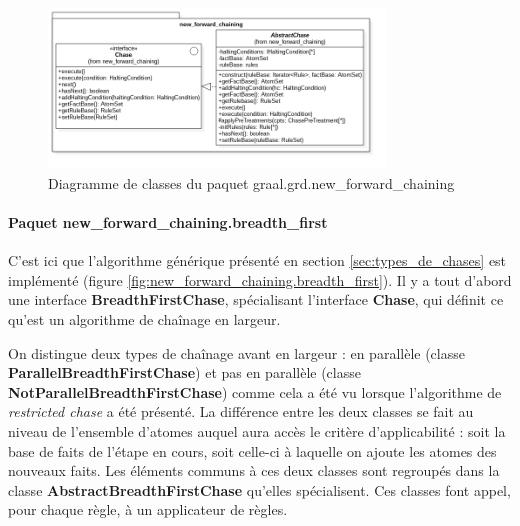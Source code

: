        \begin{figure}[h]
        \centering
        \vspace{-10pt}
        \includegraphics[width=0.8\textwidth]{pictures/new_forward_chaining.png}
        \vspace{-20pt}
        \caption{Diagramme de classes du paquet graal.grd.new\_forward\_chaining}
        \label{fig:new_forward_chaining}
        \vspace{-15pt}
        \end{figure}
       
       \paragraph{Paquet new\_forward\_chaining.breadth\_first} C'est ici que l'algorithme générique présenté en section \ref{sec:types_de_chases} est implémenté (figure \ref{fig:new_forward_chaining.breadth_first}). Il y a tout d'abord une interface \textbf{BreadthFirstChase}, spécialisant l'interface \textbf{Chase}, qui définit ce qu'est un algorithme de chaînage en largeur.
       \par On distingue deux types de chaînage avant en largeur : en parallèle (classe \textbf{ParallelBreadthFirstChase}) et pas en parallèle (classe \textbf{NotParallelBreadthFirstChase}) comme cela a été vu lorsque l'algorithme de \textit{restricted chase} a été présenté. La différence entre les deux classes se fait au niveau de l'ensemble d'atomes auquel aura accès le critère d'applicabilité : soit la base de faits de l'étape en cours, soit celle-ci à laquelle on ajoute les atomes des nouveaux faits. Les éléments communs à ces deux classes sont regroupés dans la classe \textbf{AbstractBreadthFirstChase} qu'elles spécialisent. Ces classes font appel, pour chaque règle, à un applicateur de règles.
       
